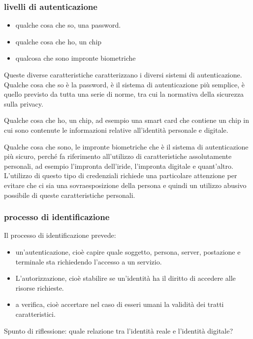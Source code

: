 \subsubsection{livelli di autenticazione}
 
 \begin{itemize}
     \item qualche cosa che so, una password.
     \item qualche cosa che ho, un chip
     \item qualcosa che sono impronte biometriche
 \end{itemize}
 Queste diverse caratteristiche caratterizzano i diversi sistemi di autenticazione. Qualche cosa che so è la password, è il sistema di autenticazione più semplice, è quello previsto da tutta una serie di norme, tra cui la normativa della sicurezza sulla privacy.\par
 Qualche cosa che ho, un chip, ad esempio una smart card che contiene un chip in cui sono contenute le informazioni relative all'identità personale e digitale.\par
 Qualche cosa che sono, le impronte biometriche che è il sistema di autenticazione più sicuro, perché fa riferimento all'utilizzo di caratteristiche assolutamente personali, ad esempio l'impronta dell'iride, l'impronta digitale e quant'altro. L'utilizzo di questo tipo di credenziali richiede una particolare attenzione per evitare che ci sia una sovraesposizione della persona e quindi un utilizzo abusivo possibile di queste caratteristiche personali.\par
\subsubsection{processo di identificazione }
 
 Il processo di identificazione prevede:
 \begin{itemize}
     \item un'autenticazione, cioè capire quale soggetto, persona, server, postazione e terminale sta richiedendo l'accesso a un servizio.
     \item L'autorizzazione, cioè stabilire se un'identità ha il diritto di accedere alle risorse richieste.
     \item a verifica, cioè accertare nel caso di esseri umani la validità dei tratti caratteristici.
 \end{itemize}
 
 Spunto di riflessione: quale relazione tra l'identità reale e l'identità digitale?
 
